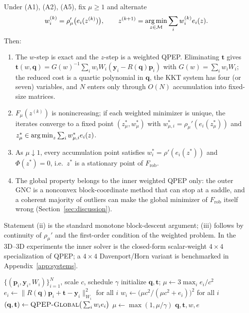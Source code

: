 \begin{theorem}\label{thm:gnc}
Under (A1), (A2), (A5), fix $\mu\ge1$ and alternate
\begin{equation}
w_i^{(k)}=\rho_\mu'\big(e_i(z^{(k)})\big),\qquad
z^{(k+1)}=\operatorname*{arg\,min}_{z\in\mathcal{M}}\sum_iw_i^{(k)}e_i(z).
\end{equation}
Then:
\begin{enumerate}
\item[(i)] The $w$-step is exact and the $z$-step is a weighted QPEP. Eliminating $\mathbf{t}$ gives
  $\mathbf{t}(w,\mathbf{q})=G(w)^{-1}\sum_iw_iW_i(\mathbf{y}_i-R(\mathbf{q})\mathbf{p}_i)$ with
  $G(w)=\sum_iw_iW_i$; the reduced cost is a quartic polynomial in $\mathbf{q}$, the KKT system has
  four (or seven) variables, and $N$ enters only through $O(N)$ accumulation into fixed-size
  matrices.
\item[(ii)] $F_\mu(z^{(k)})$ is nonincreasing; if each weighted minimizer is unique, the iterates
  converge to a fixed point $(z_\mu^*,w_\mu^*)$ with $w_{\mu,i}^*=\rho_\mu'(e_i(z_\mu^*))$ and
  $z_\mu^*\in\operatorname*{arg\,min}_z\sum_iw_{\mu,i}^*e_i(z)$.
\item[(iii)] As $\mu\downarrow1$, every accumulation point satisfies $w_i^*=\rho'(e_i(z^*))$ and
  $\Phi(z^*)=0$, i.e.\ $z^*$ is a stationary point of $F_{\mathrm{rob}}$.
\item[(iv)] The global property belongs to the inner weighted QPEP only: the outer GNC is a
  nonconvex block-coordinate method that can stop at a saddle, and a coherent majority of outliers
  can make the global minimizer of $F_{\mathrm{rob}}$ itself wrong
  (Section~\ref{sec:discussion}).
\end{enumerate}
Statement (ii) is the standard monotone block-descent argument; (iii) follows by continuity of
$\rho_\mu'$ and the first-order condition of the weighted problem. In the 3D--3D experiments the
inner solver is the closed-form scalar-weight $4\times4$ specialization of QPEP; a
$4\times4$ Davenport/Horn variant is benchmarked in Appendix~\ref{app:systems}.
\end{theorem}

\begin{algorithm}[t]
\caption{Forward GNC-QPEP (one robust solve)}
\label{alg:forward}
\footnotesize
\begin{algorithmic}[1]
\Require $\{(\mathbf{p}_i,\mathbf{y}_i,W_i)\}_{i=1}^N$, scale $c$, schedule $\gamma$
\State initialize $\mathbf{q},\mathbf{t}$; $\mu\gets3\max_ie_i/c^2$
    \State $e_i\gets\|R(\mathbf{q})\mathbf{p}_i+\mathbf{t}-\mathbf{y}_i\|_{W_i}^2$ for all $i$
    \State $w_i\gets\big(\mu c^2/(\mu c^2+e_i)\big)^2$ for all $i$
    \State $(\mathbf{q},\mathbf{t})\gets\textsc{QPEP-Global}\big(\sum_iw_ie_i\big)$
  \EndFor
  \State $\mu\gets\max(1,\mu/\gamma)$
\EndWhile
\State \Return $\mathbf{q},\mathbf{t},w,e$
\end{algorithmic}
\end{algorithm}

